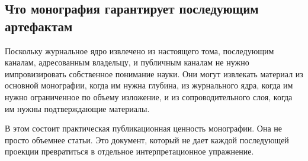 \subsection{Что монография гарантирует последующим артефактам}

Поскольку журнальное ядро извлечено из настоящего тома, последующим каналам, адресованным владельцу, и
публичным каналам не нужно импровизировать собственное понимание науки.
Они могут извлекать материал из основной монографии, когда им нужна глубина, из журнального ядра, когда им нужно
ограниченное по объему изложение, и из сопроводительного слоя, когда им нужны подтверждающие материалы.

В этом состоит практическая публикационная ценность монографии.
Она не просто объемнее статьи.
Это документ, который не дает каждой последующей проекции превратиться в отдельное интерпретационное
упражнение.

\clearpage
